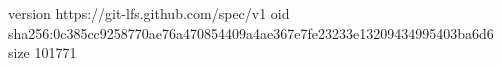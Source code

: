 version https://git-lfs.github.com/spec/v1
oid sha256:0c385cc9258770ae76a470854409a4ae367e7fe23233e13209434995403ba6d6
size 101771

